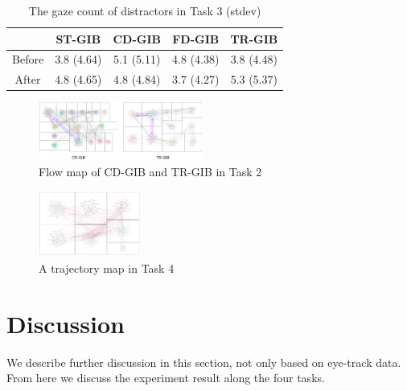 \documentclass{vgtc}                          %
\begin{document}
\begin{table}[htb]
  \begin{center}
   \caption{The gaze count of distractors in Task 3 (stdev)}
    \begin{tabular}{|c|c|c|c|c|} \hline
      & ST-GIB & CD-GIB & FD-GIB & TR-GIB \\ \hline
      Before & 3.8 (4.64) & 5.1 (5.11) & 4.8 (4.38) & 3.8 (4.48) \\ \hline
      After  & 4.8 (4.65) & 4.8 (4.84) & 3.7 (4.27) & 5.3 (5.37) \\ \hline
    \end{tabular}
  \end{center}
  \label{table-dist3}
\end{table}

\begin{figure}
  \begin{center}
    \includegraphics[width=0.48\textwidth]{pictures/cd-tr-in2.png}
    \caption{Flow map of CD-GIB and TR-GIB in Task 2}
    \label{task2flow}
  \end{center}
\end{figure}

\begin{figure}
  \begin{center}
    \includegraphics[width=0.3\textwidth]{pictures/concentration.png}
    \caption{A trajectory map in Task 4}
    \label{concent}
  \end{center}
\end{figure}

\section{Discussion}
We describe further discussion in this section, not only based on eye-track data. From here we discuss the experiment result along the four tasks.
\end{document}
